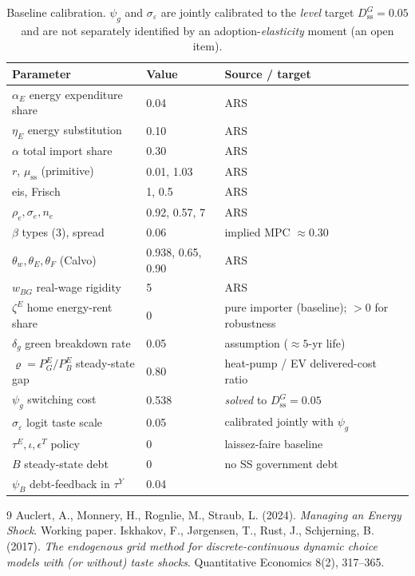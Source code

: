 \documentclass[11pt]{article}
\newcommand{\stst}{\mathrm{ss}}
\newcommand{\DG}{D^{G}}
\newcommand{\PEB}{P^{E}_{B}}
\newcommand{\PEG}{P^{E}_{G}}
\begin{document}
\begin{table}[h]\centering\small
\begin{tabular}{lll}
\toprule
Parameter & Value & Source / target\\
\midrule
$\alpha_E$ energy expenditure share & 0.04 & ARS\\
$\eta_E$ energy substitution & 0.10 & ARS\\
$\alpha$ total import share & 0.30 & ARS\\
$r$, $\mu_{\stst}$ (primitive) & 0.01, 1.03 & ARS\\
eis, Frisch & 1, 0.5 & ARS\\
$\rho_e,\sigma_e,n_e$ & 0.92, 0.57, 7 & ARS\\
$\beta$ types (3), spread & 0.06 & implied MPC $\approx 0.30$\\
$\theta_w,\theta_E,\theta_F$ (Calvo) & 0.938, 0.65, 0.90 & ARS\\
$w_{BG}$ real-wage rigidity & 5 & ARS\\
$\zeta^{E}$ home energy-rent share & 0 & pure importer (baseline); $>0$ for robustness\\
\midrule
$\delta_g$ green breakdown rate & 0.05 & assumption ($\approx 5$-yr life)\\
$\varrho=\PEG/\PEB$ steady-state gap & 0.80 & heat-pump / EV delivered-cost ratio\\
$\psi_g$ switching cost & 0.538 & \emph{solved} to $\DG_{\stst}=0.05$\\
$\sigma_\varepsilon$ logit taste scale & 0.05 & calibrated jointly with $\psi_g$\\
\midrule
$\tau^{E},\iota,\epsilon^{T}$ policy & 0 & laissez-faire baseline\\
$B$ steady-state debt & 0 & no SS government debt\\
$\psi_B$ debt-feedback in $\tau^{Y}$ & 0.04 & \\
\bottomrule
\end{tabular}
\caption{Baseline calibration. $\psi_g$ and $\sigma_\varepsilon$ are jointly
calibrated to the \emph{level} target $\DG_{\stst}=0.05$ and are not separately
identified by an adoption-\emph{elasticity} moment (an open item).}
\end{table}

\begin{thebibliography}{9}
 Auclert, A., Monnery, H., Rognlie, M., Straub, L. (2024).
\emph{Managing an Energy Shock}. Working paper.
 Iskhakov, F., J{\o}rgensen, T., Rust, J., Schjerning, B.
(2017). \emph{The endogenous grid method for discrete-continuous dynamic choice
models with (or without) taste shocks}. Quantitative Economics 8(2), 317--365.
\end{thebibliography}
\end{document}
